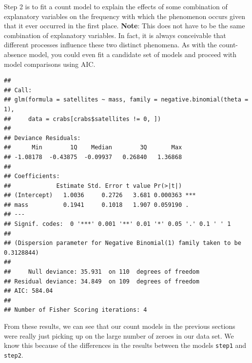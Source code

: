 \documentclass[
]{book}
\newenvironment{Shaded}{\begin{snugshade}}{\end{snugshade}}
\newcommand{\CommentTok}[1]{\textcolor[rgb]{0.56,0.35,0.01}{\textit{#1}}}
\newcommand{\DataTypeTok}[1]{\textcolor[rgb]{0.13,0.29,0.53}{#1}}
\newcommand{\DecValTok}[1]{\textcolor[rgb]{0.00,0.00,0.81}{#1}}
\newcommand{\KeywordTok}[1]{\textcolor[rgb]{0.13,0.29,0.53}{\textbf{#1}}}
\newcommand{\NormalTok}[1]{#1}
\newcommand{\OperatorTok}[1]{\textcolor[rgb]{0.81,0.36,0.00}{\textbf{#1}}}
\newcommand{\StringTok}[1]{\textcolor[rgb]{0.31,0.60,0.02}{#1}}
\begin{document}
Step 2 is to fit a count model to explain the effects of some combination of explanatory variables on the frequency with which the phenomenon occurs given that it ever occurred in the first place. \textbf{Note}: This does not have to be the same combination of explanatory variables. In fact, it is always conceivable that different processes influence these two distinct phenomena. As with the count-absence model, you could even fit a candidate set of models and proceed with model comparisons using AIC.

\begin{Shaded}
\end{Shaded}

\begin{verbatim}
## 
## Call:
## glm(formula = satellites ~ mass, family = negative.binomial(theta = 1), 
##     data = crabs[crabs$satellites != 0, ])
## 
## Deviance Residuals: 
##      Min        1Q    Median        3Q       Max  
## -1.08178  -0.43875  -0.09937   0.26840   1.36868  
## 
## Coefficients:
##             Estimate Std. Error t value Pr(>|t|)    
## (Intercept)   1.0036     0.2726   3.681 0.000363 ***
## mass          0.1941     0.1018   1.907 0.059190 .  
## ---
## Signif. codes:  0 '***' 0.001 '**' 0.01 '*' 0.05 '.' 0.1 ' ' 1
## 
## (Dispersion parameter for Negative Binomial(1) family taken to be 0.3128844)
## 
##     Null deviance: 35.931  on 110  degrees of freedom
## Residual deviance: 34.849  on 109  degrees of freedom
## AIC: 584.04
## 
## Number of Fisher Scoring iterations: 4
\end{verbatim}

From these results, we can see that our count models in the previous sections were really just picking up on the large number of zeroes in our data set. We know this because of the differences in the results between the models \texttt{step1} and \texttt{step2}.
\end{document}
